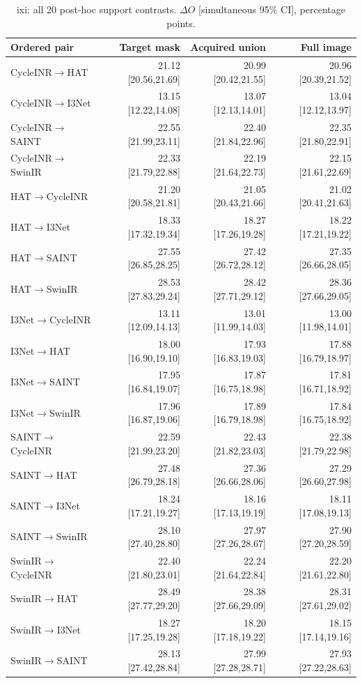 \begin{table}[t]\centering\scriptsize
\caption{ixi: all 20 post-hoc support contrasts. $\Delta O$ [simultaneous 95\% CI], percentage points.}\label{tab:support-ixi}\setlength{\tabcolsep}{4pt}
\begin{tabular}{lrrr}\toprule
Ordered pair & Target mask & Acquired union & Full image\\\midrule
CycleINR$\to$HAT & 21.12 [20.56,21.69] & 20.99 [20.42,21.55] & 20.96 [20.39,21.52] \\
CycleINR$\to$I3Net & 13.15 [12.22,14.08] & 13.07 [12.13,14.01] & 13.04 [12.12,13.97] \\
CycleINR$\to$SAINT & 22.55 [21.99,23.11] & 22.40 [21.84,22.96] & 22.35 [21.80,22.91] \\
CycleINR$\to$SwinIR & 22.33 [21.79,22.88] & 22.19 [21.64,22.73] & 22.15 [21.61,22.69] \\
HAT$\to$CycleINR & 21.20 [20.58,21.81] & 21.05 [20.43,21.66] & 21.02 [20.41,21.63] \\
HAT$\to$I3Net & 18.33 [17.32,19.34] & 18.27 [17.26,19.28] & 18.22 [17.21,19.22] \\
HAT$\to$SAINT & 27.55 [26.85,28.25] & 27.42 [26.72,28.12] & 27.35 [26.66,28.05] \\
HAT$\to$SwinIR & 28.53 [27.83,29.24] & 28.42 [27.71,29.12] & 28.36 [27.66,29.05] \\
I3Net$\to$CycleINR & 13.11 [12.09,14.13] & 13.01 [11.99,14.03] & 13.00 [11.98,14.01] \\
I3Net$\to$HAT & 18.00 [16.90,19.10] & 17.93 [16.83,19.03] & 17.88 [16.79,18.97] \\
I3Net$\to$SAINT & 17.95 [16.84,19.07] & 17.87 [16.75,18.98] & 17.81 [16.71,18.92] \\
I3Net$\to$SwinIR & 17.96 [16.87,19.06] & 17.89 [16.79,18.98] & 17.84 [16.75,18.92] \\
SAINT$\to$CycleINR & 22.59 [21.99,23.20] & 22.43 [21.82,23.03] & 22.38 [21.79,22.98] \\
SAINT$\to$HAT & 27.48 [26.79,28.18] & 27.36 [26.66,28.06] & 27.29 [26.60,27.98] \\
SAINT$\to$I3Net & 18.24 [17.21,19.27] & 18.16 [17.13,19.19] & 18.11 [17.08,19.13] \\
SAINT$\to$SwinIR & 28.10 [27.40,28.80] & 27.97 [27.26,28.67] & 27.90 [27.20,28.59] \\
SwinIR$\to$CycleINR & 22.40 [21.80,23.01] & 22.24 [21.64,22.84] & 22.20 [21.61,22.80] \\
SwinIR$\to$HAT & 28.49 [27.77,29.20] & 28.38 [27.66,29.09] & 28.31 [27.61,29.02] \\
SwinIR$\to$I3Net & 18.27 [17.25,19.28] & 18.20 [17.18,19.22] & 18.15 [17.14,19.16] \\
SwinIR$\to$SAINT & 28.13 [27.42,28.84] & 27.99 [27.28,28.71] & 27.93 [27.22,28.63] \\\bottomrule\end{tabular}\end{table}
